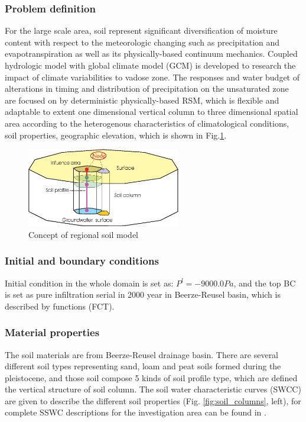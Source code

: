 \subsubsection*{Problem definition}
For the large scale area, soil represent significant
diversification of moisture content with respect to the
meteorologic changing such as precipitation and evapotranspiration
as well as its physically-based continuum mechanics. Coupled
hydrologic model with global climate model (GCM) is developed to
research the impact of climate variabilities to vadose zone. The
responses and water budget of alterations in timing and
distribution of precipitation on the unsaturated zone are focused
on by deterministic physically-based RSM, which is flexible and
adaptable to extent one dimensional vertical column to three
dimensional spatial area according to the heterogenous
characteristics of climatological conditions, soil properties,
geographic elevation, which is shown in Fig.\ref{us:RSMmodelconcept}. \\
\begin{figure}[htb!]
  \center
  \includegraphics[width=0.6\textwidth]{H_US/figures/RSMconcept.eps}
  \caption{Concept of regional soil model}
  \label{us:RSMmodelconcept}
\end{figure}
\subsubsection*{Initial and boundary conditions}
Initial condition in the whole domain is set as: $P^l=-9000.0 Pa$,
and the top BC is set as pure infiltration serial in 2000 year in
Beerze-Reusel basin, which is described by functions (FCT).

\subsubsection*{Material properties}
The soil materials are from Beerze-Reusel drainage basin. There
are several different soil types representing sand, loam and peat
soils formed during the pleistocene, and those soil compose 5
kinds of soil profile type, which are defined the vertical
structure of soil column. The soil water characteristic curves
(SWCC) are given to describe the different soil properties (Fig.
\ref{fig:soil_columns}, left), for complete SSWC descriptions for
the investigation area can be found in \cite{DuEtAl:2006}.
%
